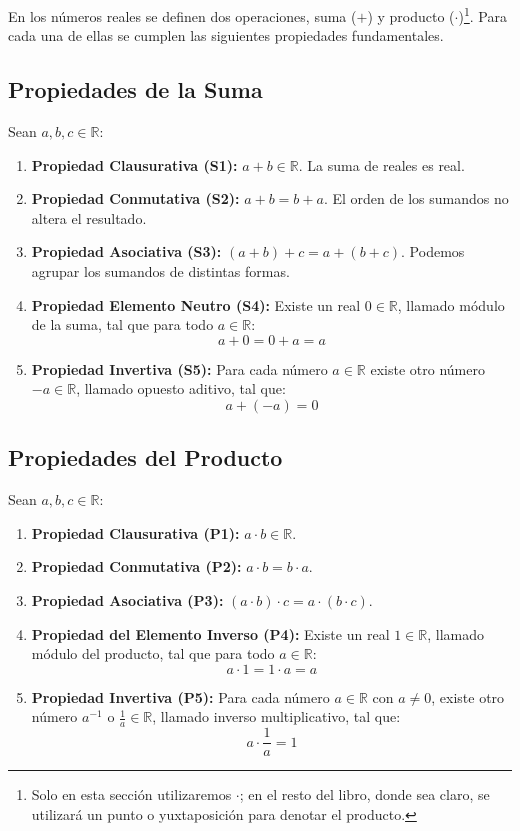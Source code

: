 En los números reales se definen dos operaciones, suma ($+$) y producto ($\cdot$)\footnote{Solo en esta sección utilizaremos $\cdot$; en el resto del libro, donde sea claro, se utilizará un punto o yuxtaposición para denotar el producto.}. Para cada una de ellas se cumplen las siguientes propiedades fundamentales.

\subsection*{Propiedades de la Suma}
Sean $a,b,c \in \mathbb{R}$:
\begin{enumerate}
    \item \textbf{Propiedad Clausurativa (S1):} $a+b \in \mathbb{R}$. La suma de reales es real.
    \item \textbf{Propiedad Conmutativa (S2):} $a+b = b+a$. El orden de los sumandos no altera el resultado.
    \item \textbf{Propiedad Asociativa (S3):} $(a+b)+c = a+(b+c)$. Podemos agrupar los sumandos de distintas formas.
    \item \textbf{Propiedad Elemento Neutro (S4):} Existe un real $0 \in \mathbb{R}$, llamado módulo de la suma, tal que para todo $a \in \mathbb{R}$:
    \[ a+0 = 0+a = a \]
    \item \textbf{Propiedad Invertiva (S5):} Para cada número $a \in \mathbb{R}$ existe otro número $-a \in \mathbb{R}$, llamado opuesto aditivo, tal que:
    \[ a+(-a) = 0 \]
\end{enumerate}

\subsection*{Propiedades del Producto}
Sean $a,b,c \in \mathbb{R}$:
\begin{enumerate}
    \item \textbf{Propiedad Clausurativa (P1):} $a\cdot  b \in \mathbb{R}$.
    \item \textbf{Propiedad Conmutativa (P2):} $a\cdot  b = b\cdot a$.
    \item \textbf{Propiedad Asociativa (P3):} $(a\cdot b)\cdot c = a\cdot(b\cdot c)$.
    \item \textbf{Propiedad del Elemento Inverso (P4):} Existe un real $1 \in \mathbb{R}$, llamado módulo del producto, tal que para todo $a \in \mathbb{R}$:
    \[ a\cdot 1 = 1\cdot a = a \]
    \item \textbf{Propiedad Invertiva (P5):} Para cada número $a \in \mathbb{R}$ con $a \neq 0$, existe otro número $a^{-1}$ o $\frac{1}{a} \in \mathbb{R}$, llamado inverso multiplicativo, tal que:
    \[ a \cdot \frac{1}{a} = 1 \]
\end{enumerate}

